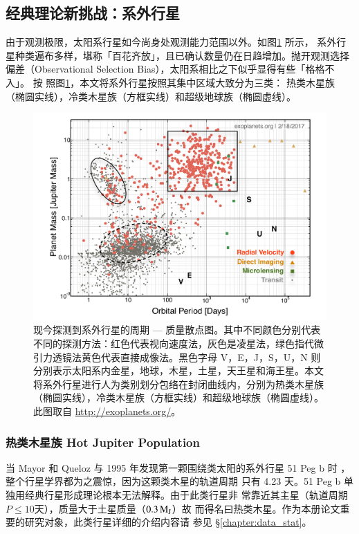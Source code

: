\subsection{经典理论新挑战：系外行星} \label{sec: exopftheory}

由于观测极限，太阳系行星如今尚身处观测能力范围以外。如图\ref{fig:exomassper} 所示，
系外行星种类遍布多样，堪称「百花齐放」，且已确认数量仍在日趋增加。抛开观测选择
偏差（Observational Selection Bias），太阳系相比之下似乎显得有些「格格不入」。 按
照图\ref{fig:exomassper}，本文将系外行星按照其集中区域大致分为三类： 热类木星族
（椭圆实线），冷类木星族（方框实线）和超级地球族（椭圆虚线）。

\begin{figure}[h]
\centering
\includegraphics[width=1.0\textwidth]{figures/chapter1/fig12_nasaexompplot.pdf}
\caption{现今探测到系外行星的周期 --- 质量散点图。其中不同颜色分别代表不同的探测方法：红色代表视向速度法，灰色是凌星法，绿色指代微引力透镜法黄色代表直接成像法。黑色字母 V，E，J，S，U，N 则分别表示太阳系内金星，地球，木星，土星，天王星和海王星。本文将系外行星进行人为类别划分包络在封闭曲线内，分别为热类木星族（椭圆实线），冷类木星族（方框实线）和超级地球族（椭圆虚线）。此图取自 \url{http://exoplanets.org/}。}
\label{fig:exomassper}
\end{figure}

\subsubsection{热类木星族 Hot Jupiter Population}

当 Mayor 和 Queloz 与 1995 年发现第一颗围绕类太阳的系外行星 51 Peg b 时
\cite{MayorQueloz1995}，整个行星学界都为之震惊，因为这颗类木星的轨道周期
只有 4.23 天。51 Peg b 单独用经典行星形成理论根本无法解释。由于此类行星非
常靠近其主星（轨道周期 $P \le10 $天），质量大于土星质量（$0.3\,\mathrm{M}_\mathrm{J}$）故
而得名曰热类木星。作为本册论文重要的研究对象，此类行星详细的介绍内容请
参见 \S \ref{chapter:data_stat}。


